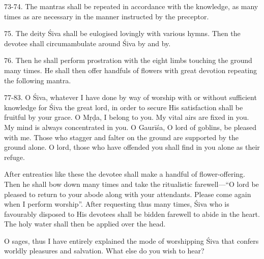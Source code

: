 73-74. The mantras shall be repeated in accordance with the knowledge, as many
times as are necessary in the manner instructed by the preceptor.

75. The deity Śiva shall be eulogised lovingly with various hymns. Then
the devotee shall circumambulate around Śiva by and by.

76. Then he shall perform prostration with the eight limbs touching the ground
many times. He shall then offer handfuls of flowers with great devotion
repeating the following mantra.

77-83. O Śiva, whatever I have done by way of worship \etc with or without
sufficient knowledge for Śiva the great lord, in order to secure His
satisfaction shall be fruitful by your grace. O Mṛḍa, I belong to you. My vital
airs are fixed in you. My mind is always concentrated in you. O Gaurīśa, O lord
of goblins, be pleased with me. Those who stagger and falter on the ground are
supported by the ground alone. O lord, those who have offended you shall find in
you alone as their refuge.

After entreaties like these the devotee shall make a handful of flower-offering.
Then he shall bow down many times and take the ritualistic farewell—“O lord be
pleased to return to your abode along with your attendants. Please come again
when I perform worship”. After requesting thus many times, Śiva who is
favourably disposed to His devotees shall be bidden farewell to abide in
the heart. The holy water shall then be applied over the head.

O sages, thus I have entirely explained the mode of worshipping Śiva that
confers worldly pleasures and salvation. What else do you wish to hear?
